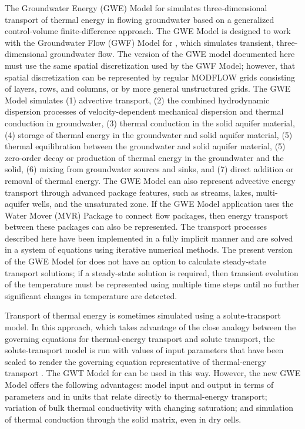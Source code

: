 
The Groundwater Energy (GWE) Model for \mf simulates three-dimensional transport of thermal energy in flowing groundwater based on a generalized control-volume finite-difference approach.  The GWE Model is designed to work with the Groundwater Flow (GWF) Model \citep{modflow6gwf} for \mf, which simulates transient, three-dimensional groundwater flow.  The version of the GWE model documented here must use the same spatial discretization used by the GWF Model; however, that spatial discretization can be represented by regular MODFLOW grids consisting of layers, rows, and columns, or by more general unstructured grids.  The GWE Model simulates (1) advective transport, (2) the combined hydrodynamic dispersion processes of velocity-dependent mechanical dispersion and thermal conduction in groundwater, (3) thermal conduction in the solid aquifer material, (4) storage of thermal energy in the groundwater and solid aquifer material, (5) thermal equilibration between the groundwater and solid aquifer material, (5) zero-order decay or production of thermal energy in the groundwater and the solid, (6) mixing from groundwater sources and sinks, and (7) direct addition or removal of thermal energy.  The GWE Model can also represent advective energy transport through advanced package features, such as streams, lakes, multi-aquifer wells, and the unsaturated zone. If the GWE Model application uses the Water Mover (MVR) Package to connect flow packages, then energy transport between these packages can also be represented. The transport processes described here have been implemented in a fully implicit manner and are solved in a system of equations using iterative numerical methods.  The present version of the GWE Model for \mf does not have an option to calculate steady-state transport solutions; if a steady-state solution is required, then transient evolution of the temperature must be represented using multiple time steps until no further significant changes in temperature are detected.

Transport of thermal energy is sometimes simulated using a solute-transport model. In this approach, which takes advantage of the close analogy between the governing equations for thermal-energy transport and solute transport, the solute-transport model is run with values of input parameters that have been scaled to render the governing equation representative of thermal-energy transport \citep{thorne2006, hechtmendez, mazheng2010}. The GWT Model for \mf can be used in this way. However, the new GWE Model offers the following advantages: model input and output in terms of parameters and in units that relate directly to thermal-energy transport; variation of bulk thermal conductivity with changing saturation; and simulation of thermal conduction through the solid matrix, even in dry cells.

